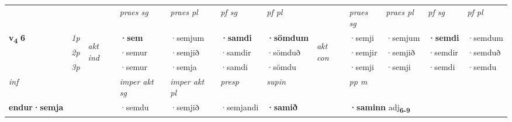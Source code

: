 \begin{longtable}[l]{X>{\footnotesize\itshape}llXXXXlXXXX}
\midrule

 & &   & \textit{praes sg}  & \textit{praes pl}    & \textit{ pf sg} & \textit{pf pl} & & \textit{praes sg}  & \textit{praes pl}    & \textit{pf sg} & \textit{pf pl }  \\ \cmidrule{4-7} \cmidrule{9-12}
 \multirow{2}{*}{{{\textbf{v{\textsubscript{4}}} \Large{\textbf{6}}}}}  & 1p & \multirow{3}{*}{\begin{turn}{90}\textit{akt ind}\end{turn}} & \textbf{·sem} & ·semjum & \textbf{·samdi} & \textbf{·sömdum} & \multirow{3}{*}{\begin{turn}{90}\textit{akt con}\end{turn}} &·semji & ·semjum & \textbf{·semdi} & ·semdum\\*
 & 2p &  &  ·semur  & ·semjið & ·samdir & ·sömduð & & ·semjir & ·semjið & ·semdir & ·semduð \\*
 & 3p &  & ·semur & ·semja & ·samdi & ·sömdu & & ·semji & ·semji& ·semdi & ·semdu \\*
\cmidrule{4-7} \cmidrule{9-12}

   {\textit{inf}} & &  & \textit{imper akt sg} & \textit{imper akt pl}   & \textit{presp} & \textit{supin}  && \textit{pp m} \\*
  {\textbf{endur\allowbreak ·semja}} & && ·semdu  & ·semjið   & ·semjandi &  \textbf{·samið}  && \multicolumn{2}{l}{\textbf{·saminn} adj\textbf{\textsubscript{6-9}}} \\*

\midrule


\end{longtable}
